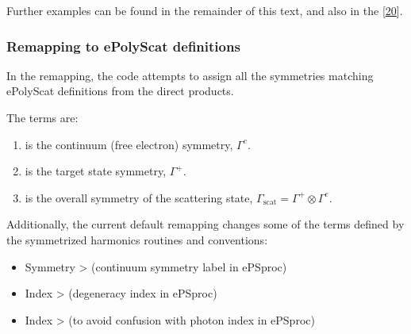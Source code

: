 \documentclass[letterpaper,table,10pt,english]{jupyterBook}
\begin{document}
\sphinxAtStartPar
Further examples can be found in the remainder of this text, and also in the  {[}\hyperlink{cite.backmatter/bibliography:id679}{20}{]}.


\subsubsection{Remapping to ePolyScat definitions}
\label{\detokenize{part2/sym-fitting-intro_240723:remapping-to-epolyscat-definitions}}\label{\detokenize{part2/sym-fitting-intro_240723:sec-basis-sets-remapping-to-eps}}
\sphinxAtStartPar
In the remapping, the code attempts to assign all the symmetries matching ePolyScat definitions from the direct products.

\sphinxAtStartPar
The terms are:
\begin{enumerate}
%
\item {} 
\sphinxAtStartPar
{} is the continuum (free electron) symmetry, \(\Gamma^{e}\).

\item {} 
\sphinxAtStartPar
{} is the target state symmetry, \(\Gamma^{+}\).

\item {} 
\sphinxAtStartPar
{} is the overall symmetry of the scattering state, \(\Gamma_{\mathrm{scat}}=\Gamma^{+}\otimes\Gamma^{e}\).

\end{enumerate}

\sphinxAtStartPar
Additionally, the current default remapping changes some of the terms defined by the symmetrized harmonics routines and conventions:
\begin{itemize}
\item {} 
\sphinxAtStartPar
Symmetry  >  (continuum symmetry label in ePSproc)

\item {} 
\sphinxAtStartPar
Index  >  (degeneracy index in ePSproc)

\item {} 
\sphinxAtStartPar
Index  >  (to avoid confusion with photon index  in ePSproc)

\end{itemize}
\end{document}
